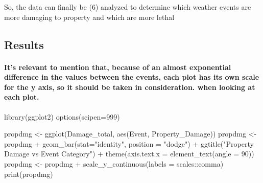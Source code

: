 \documentclass[
]{article}
\newenvironment{Shaded}{\begin{snugshade}}{\end{snugshade}}
\newcommand{\AttributeTok}[1]{\textcolor[rgb]{0.77,0.63,0.00}{#1}}
\newcommand{\DecValTok}[1]{\textcolor[rgb]{0.00,0.00,0.81}{#1}}
\newcommand{\FunctionTok}[1]{\textcolor[rgb]{0.00,0.00,0.00}{#1}}
\newcommand{\NormalTok}[1]{#1}
\newcommand{\OtherTok}[1]{\textcolor[rgb]{0.56,0.35,0.01}{#1}}
\newcommand{\SpecialCharTok}[1]{\textcolor[rgb]{0.00,0.00,0.00}{#1}}
\newcommand{\StringTok}[1]{\textcolor[rgb]{0.31,0.60,0.02}{#1}}
\begin{document}
So, the data can finally be (6) analyzed to determine which weather
events are more damaging to property and which are more lethal

\hypertarget{results}{%
\subsection{Results}\label{results}}

\hypertarget{its-relevant-to-mention-that-because-of-an-almost-exponential-difference-in-the-values-between-the-events-each-plot-has-its-own-scale-for-the-y-axis-so-it-should-be-taken-in-consideration.-when-looking-at-each-plot.}{%
\paragraph{It's relevant to mention that, because of an almost
exponential difference in the values between the events, each plot has
its own scale for the y axis, so it should be taken in consideration.
when looking at each
plot.}\label{its-relevant-to-mention-that-because-of-an-almost-exponential-difference-in-the-values-between-the-events-each-plot-has-its-own-scale-for-the-y-axis-so-it-should-be-taken-in-consideration.-when-looking-at-each-plot.}}

\begin{Shaded}
\begin{Highlighting}[]
\FunctionTok{library}\NormalTok{(ggplot2)}
\FunctionTok{options}\NormalTok{(}\AttributeTok{scipen=}\DecValTok{999}\NormalTok{)}

\NormalTok{propdmg }\OtherTok{\textless{}{-}} \FunctionTok{ggplot}\NormalTok{(Damage\_total, }\FunctionTok{aes}\NormalTok{(Event, Property\_Damage))}
\NormalTok{propdmg }\OtherTok{\textless{}{-}}\NormalTok{ propdmg }\SpecialCharTok{+} \FunctionTok{geom\_bar}\NormalTok{(}\AttributeTok{stat=}\StringTok{"identity"}\NormalTok{, }\AttributeTok{position =} \StringTok{"dodge"}\NormalTok{) }\SpecialCharTok{+} \FunctionTok{ggtitle}\NormalTok{(}\StringTok{"Property Damage vs Event Category"}\NormalTok{) }\SpecialCharTok{+} \FunctionTok{theme}\NormalTok{(}\AttributeTok{axis.text.x =} \FunctionTok{element\_text}\NormalTok{(}\AttributeTok{angle =} \DecValTok{90}\NormalTok{))}
\NormalTok{propdmg }\OtherTok{\textless{}{-}}\NormalTok{ propdmg }\SpecialCharTok{+} \FunctionTok{scale\_y\_continuous}\NormalTok{(}\AttributeTok{labels =}\NormalTok{ scales}\SpecialCharTok{::}\NormalTok{comma)}
\FunctionTok{print}\NormalTok{(propdmg)}
\end{Highlighting}
\end{Shaded}
\end{document}
